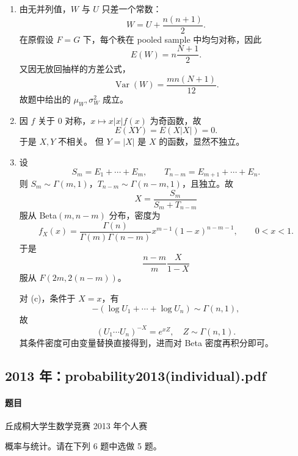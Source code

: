 \documentclass[UTF8,12pt]{ctexart}
\begin{document}
\begin{enumerate}[label=\textbf{\arabic*.},leftmargin=2.2em]
\begin{enumerate}[label=\textbf{\arabic*)},leftmargin=2.4em]
\item 这正是条件概率分解。按全概率公式即得上式，所以命题为真。
\end{enumerate}

\item 由无并列值，$W$ 与 $U$ 只差一个常数：
\[
W=U+\frac{n(n+1)}2.
\]
在原假设 $F=G$ 下，每个秩在 pooled sample 中均匀对称，因此
\[
E(W)=n\frac{N+1}{2}.
\]
又因无放回抽样的方差公式，
\[
\operatorname{Var}(W)=\frac{mn(N+1)}{12}.
\]
故题中给出的 $\mu_W,\sigma_W^2$ 成立。

\item 因 $f$ 关于 0 对称，$x\mapsto x|x|f(x)$ 为奇函数，故
\[
E(XY)=E(X|X|)=0.
\]
于是 $X,Y$ 不相关。
但 $Y=|X|$ 是 $X$ 的函数，显然不独立。

\item 设
\[
S_m=E_1+\cdots+E_m,\qquad T_{n-m}=E_{m+1}+\cdots+E_n.
\]
则 $S_m\sim\Gamma(m,1)$，$T_{n-m}\sim\Gamma(n-m,1)$，且独立。故
\[
X=\frac{S_m}{S_m+T_{n-m}}
\]
服从 Beta$(m,n-m)$ 分布，密度为
\[
 f_X(x)=\frac{\Gamma(n)}{\Gamma(m)\Gamma(n-m)}x^{m-1}(1-x)^{n-m-1},\qquad 0<x<1.
\]
于是
\[
\frac{n-m}{m}\frac{X}{1-X}
\]
服从 $F(2m,2(n-m))$。

对 (c)，条件于 $X=x$，有
\[
-(\log U_1+\cdots+\log U_n)\sim\Gamma(n,1),
\]
故
\[
(U_1\cdots U_n)^{-X}=e^{xZ},\quad Z\sim\Gamma(n,1).
\]
其条件密度可由变量替换直接得到，进而对 Beta 密度再积分即可。
\end{enumerate}

\subsection{2013 年：probability2013(individual).pdf}
\paragraph{题目}
丘成桐大学生数学竞赛 2013 年个人赛

概率与统计。请在下列 6 题中选做 5 题。
\end{document}
